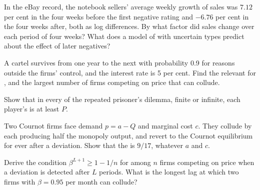 \begin{exercise}[$\star\star$]\label{exo:b2:repeated-games:8}
In the eBay record, the notebook sellers' average weekly growth of sales was $7.12$ per cent in the four weeks before the
first negative rating and $-6.76$ per cent in the four weeks after, both as log differences. By what factor did sales
change over each period of four weeks? What does a model of  with uncertain types predict about the effect
of later negatives?
\end{exercise}

\begin{exercise}[$\star\star$]\label{exo:b2:repeated-games:9}
A cartel survives from one year to the next with probability 0.9 for reasons outside the firms' control, and the interest
rate is 5 per cent. Find the  relevant for , and the largest number of firms competing on price
that can collude.
\end{exercise}

\begin{exercise}[$\star\star\star$]\label{exo:b2:repeated-games:10}
Show that in every  of the repeated prisoner's dilemma, finite or infinite, each player's  is at least $P$.
\end{exercise}

\begin{exercise}[$\star\star\star$]\label{exo:b2:repeated-games:11}
Two Cournot firms face demand $p = a - Q$ and marginal cost $c$. They collude by each producing half the monopoly output,
and revert to the Cournot equilibrium for ever after a deviation. Show that the  is $9/17$,
whatever $a$ and $c$.
\end{exercise}

\begin{exercise}[$\star\star\star$]\label{exo:b2:repeated-games:12}
Derive the condition $\beta^{L + 1} \ge 1 - 1/n$ for  among $n$ firms competing on price when a deviation is detected after
$L$ periods. What is the longest lag at which two firms with $\beta = 0.95$ per month can collude?
\end{exercise}

